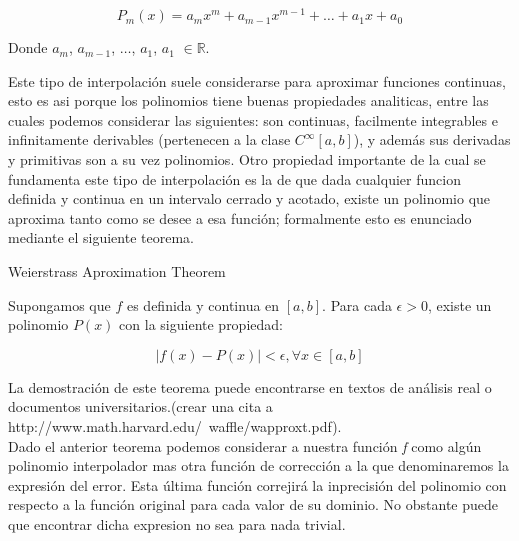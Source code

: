 \begin{equation}
	 P_m(x) = a_mx^m + a_{m-1}x^{m-1} + \dots + a_1x + a_0
\end{equation}

Donde $a_m$, $a_{m-1}$, $\dots$, $a_1$, $a_1$ $\in \mathbb{R}$.

Este tipo de interpolación suele considerarse para aproximar funciones continuas, esto es asi porque los polinomios tiene buenas propiedades analiticas, entre las cuales podemos considerar las siguientes: son continuas, facilmente integrables e infinitamente derivables (pertenecen a la clase $C^{\infty}[a, b]$), y además sus derivadas y primitivas son a su vez polinomios. Otro propiedad importante de la cual se fundamenta este tipo de interpolación es la de que dada cualquier funcion definida y continua en un intervalo cerrado y acotado, existe un polinomio que aproxima tanto como se desee a esa función; formalmente esto es enunciado mediante el siguiente teorema.


\begin{theorem}
	\item Weierstrass Aproximation Theorem
	\item Supongamos que $f$ es definida y continua en $[a, b]$. Para cada $\epsilon > 0$, existe un polinomio $P(x)$ con la siguiente propiedad:	
\end{theorem}
\begin{equation}
	 |f(x) - P(x)| < \epsilon, \forall x \in [a, b]
\end{equation}

La demostración de este teorema puede encontrarse en textos de análisis real o documentos universitarios.(crear una cita a http://www.math.harvard.edu/~waffle/wapproxt.pdf).\vspace{2mm}
\\
 Dado el anterior teorema podemos considerar a nuestra función \textit{f} como algún polinomio interpolador mas otra función de corrección a la que denominaremos la expresión del error. Esta última función correjirá la inprecisión del polinomio con respecto a la función original para cada valor de su dominio. No obstante puede que encontrar dicha expresion no sea para nada trivial.


